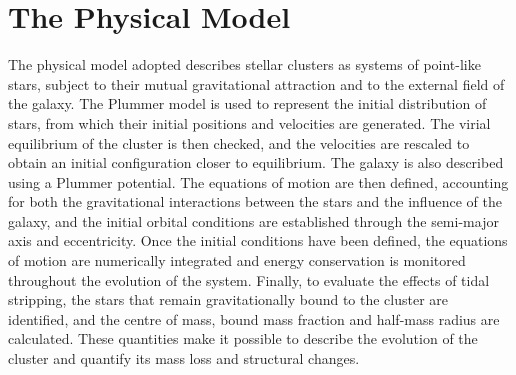 \chapter{The Physical Model}
\label{cha:modello-fisico}
The physical model adopted describes stellar clusters as systems of point-like stars, subject to their mutual gravitational attraction and to the external field of the galaxy. The Plummer model is used to represent the initial distribution of stars, from which their initial positions and velocities are generated. The virial equilibrium of the cluster is then checked, and the velocities are rescaled to obtain an initial configuration closer to equilibrium. The galaxy is also described using a Plummer potential. The equations of motion are then defined, accounting for both the gravitational interactions between the stars and the influence of the galaxy, and the initial orbital conditions are established through the semi-major axis and eccentricity.
Once the initial conditions have been defined, the equations of motion are numerically integrated and energy conservation is monitored throughout the evolution of the system. Finally, to evaluate the effects of tidal stripping, the stars that remain gravitationally bound to the cluster are identified, and the centre of mass, bound mass fraction and half-mass radius are calculated. These quantities make it possible to describe the evolution of the cluster and quantify its mass loss and structural changes.

